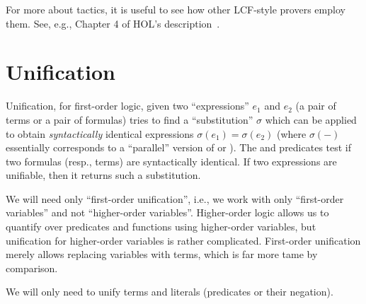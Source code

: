 \begin{node}[References]
For more about tactics, it is useful to see how other LCF-style
provers employ them. See, e.g., Chapter 4 of HOL's description~\cite{HOLdescription}.
\end{node}
\nwenddocs{}%

\section{Unification}


\begin{node}
Unification, for first-order logic, given two ``expressions'' $e_{1}$
and $e_{2}$ (a pair of terms or a pair of formulas) tries to find a
``substitution'' $\sigma$ which can be applied to obtain
\emph{syntactically} identical expressions
$\sigma(e_{1})=\sigma(e_{2})$ (where $\sigma(-)$ essentially
corresponds to a ``parallel'' version of {\Tt{}\nwendquote} or {\Tt{}\nwendquote}). The {\Tt{}\nwendquote} and {\Tt{}\nwendquote}
predicates test if two formulas (resp., terms) are syntactically
identical. If two expressions are unifiable, then it returns such a
substitution. 

We will need only ``first-order unification'', i.e., we work with only
``first-order variables'' and not ``higher-order
variables''. Higher-order logic allows us to quantify over predicates
and functions using higher-order variables, but unification for
higher-order variables is rather complicated. First-order unification
merely allows replacing variables with terms, which is far more tame
by comparison.

We will only need to unify terms and literals (predicates or their
negation). 
\end{node}

